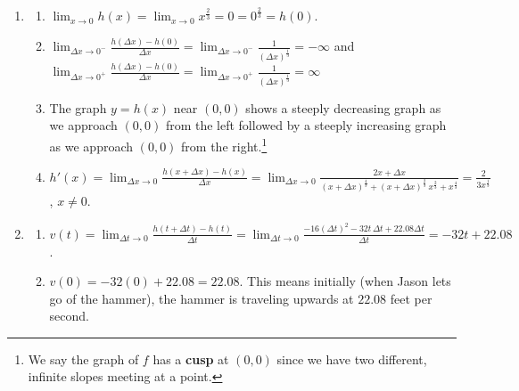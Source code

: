 \documentclass{ximera}
\begin{document}
\begin{enumerate}
\begin{enumerate}
\smallskip

\item   $g'(t) = \lim_{\Delta t \rightarrow 0} \frac{1}{(t+\Delta t)^{\frac{2}{3}} + (t+\Delta t)^{\frac{1}{3}} t^{\frac{1}{3}} + t^{\frac{2}{3}}} = \frac{1}{3 t^{\frac{2}{3}}}$, $t \neq 0$.

\end{enumerate}

\item \begin{enumerate}  \item $\lim_{x \rightarrow 0} h(x) = \lim_{x \rightarrow 0} x^{\frac{2}{3}} = 0 = 0^{\frac{2}{3}} = h(0)$. 

\item $\lim_{\Delta x \rightarrow 0^{-}} \frac{h(\Delta x) - h(0)}{\Delta x} = \lim_{\Delta x \rightarrow 0^{-}} \frac{1}{(\Delta x)^{\frac{1}{3}}} = -\infty$ and  $\lim_{\Delta x \rightarrow 0^{+}} \frac{h(\Delta x) - h(0)}{\Delta x} = \lim_{\Delta x \rightarrow 0^{+}} \frac{1}{(\Delta x)^{\frac{1}{3}}} = \infty$

\smallskip
        
\item  The graph $y = h(x)$ near $(0,0)$ shows a steeply decreasing graph as we approach $(0,0)$ from the left followed by a steeply increasing graph as we approach $(0,0)$ from the right.\footnote{We say the graph of $f$ has a  \textbf{cusp} at $(0,0)$ since we have two different, infinite slopes meeting at a point.}

\smallskip

\item  $h'(x) =  \lim_{\Delta x \rightarrow 0} \frac{h(x+\Delta x) - h(x)}{\Delta x} = \lim_{\Delta x \rightarrow 0} \frac{2x + \Delta x}{(x+\Delta x)^{\frac{4}{3}} + (x+\Delta x)^{\frac{2}{3}} \, x^{\frac{2}{3}} + x^{\frac{4}{3}}} = \frac{2}{3x^{\frac{1}{3}}}$, $x \neq 0$.
\end{enumerate}

\item  \begin{enumerate}

\item  $v(t) = \lim_{\Delta t \rightarrow 0} \frac{h(t + \Delta t) - h(t)}{\Delta t} = \lim_{\Delta t \rightarrow 0} \frac{-16(\Delta t)^2 -32 t \, \Delta t + 22.08 \Delta t}{\Delta t}  = -32t + 22.08$.

\item   $v(0) = -32(0) + 22.08 = 22.08$. This means initially (when Jason lets go of the hammer), the hammer is traveling upwards at $22.08$ feet per second.


\end{enumerate}
\end{enumerate}
\end{document}
